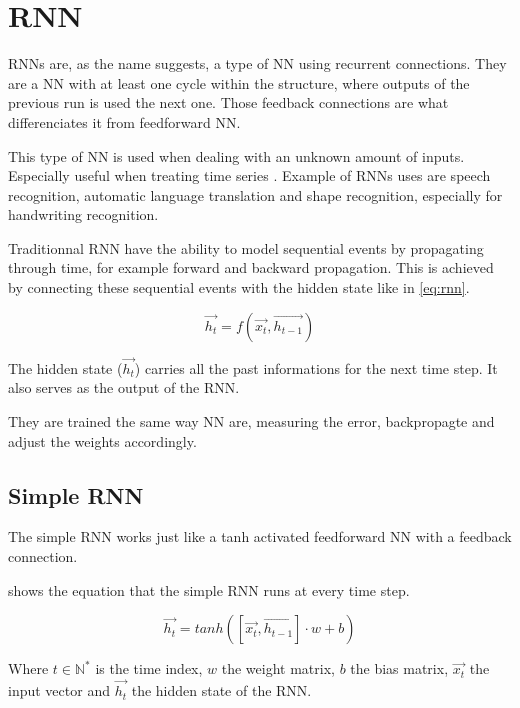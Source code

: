 \section{\acs{RNN}}\label{sec:rnn}

\acp{RNN} are, as the name suggests, a type of \ac{NN} using recurrent connections. They are a \ac{NN} with at least one cycle within the structure, where outputs of the previous run is used the next one. Those feedback connections are what differenciates it from feedforward \ac{NN}.

This type of \ac{NN} is used when dealing with an unknown amount of inputs. Especially useful when treating time series \cite{rnn}. Example of \acp{RNN} uses are speech recognition, automatic language translation \cite{gru} and shape recognition, especially for handwriting recognition.

Traditionnal \ac{RNN} have the ability to model sequential events by propagating through time, for example forward and backward propagation. This is achieved by connecting these sequential events with the hidden state like in \cref{eq:rnn}.

\begin{equation}\label{eq:rnn}
  \overrightarrow{h_t}=f(\overrightarrow{x_t},\overrightarrow{h_{t-1}})
\end{equation}

The hidden state ($\overrightarrow{h_t}$) carries all the past informations for the next time step. It also serves as the output of the \ac{RNN}.

They are trained the same way \ac{NN} are, measuring the error, backpropagte and adjust the weights accordingly.

\subsection{Simple \ac{RNN}}

The simple \ac{RNN} works just like a \ac{tanh} activated feedforward \ac{NN} with a feedback connection.

 shows the equation that the simple \ac{RNN} runs at every time step.

\begin{equation}\label{eq:srnn}
  \overrightarrow{h_t}=tanh([\overrightarrow{x_t},\overrightarrow{h_{t-1}}]\cdot w + b)
\end{equation}

Where $t\in\mathbb{N}^*$ is the time index, $w$ the weight matrix, $b$ the bias matrix, $\overrightarrow{x_t}$ the input vector and $\overrightarrow{h_{t}}$ the hidden state of the \ac{RNN}.

